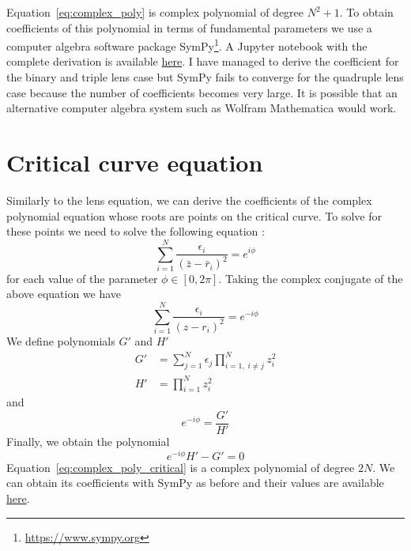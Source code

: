 \documentclass[12pt,dvipsnames]{report}
\newcommand{\ssf}[1]{\textsf{#1}}
\begin{document}
Equation~\ref{eq:complex_poly} is complex polynomial of degree $N^2+1$. To obtain coefficients of this
polynomial in terms of fundamental parameters we use a computer algebra software package \ssf{SymPy}\footnote{
    \url{https://www.sympy.org}
}\citep{10.7717/peerj-cs.103}. A Jupyter notebook with the complete derivation is available
\href{https://github.com/fbartolic/caustics/blob/main/notebooks/ComplexPolynomialCoefficients.ipynb}{here}.
I have managed to derive the coefficient for the binary and triple lens case but \ssf{SymPy} fails to
converge for the quadruple lens case because the number of coefficients becomes very large.
It is possible that an alternative computer algebra system such as Wolfram Mathematica would work.

\section{Critical curve equation}
\label{app:complex_poly_crit}
Similarly to the lens equation, we can derive the coefficients of the complex
polynomial equation whose roots are points on the critical curve. To solve for
these points we need to solve the following equation
\citep{1990A&A...236..311W}:
\begin{equation}
    \sum_{i=1}^{N} \frac{\epsilon_{i}}{\left(\bar{z}-\bar{r}_{i}\right)^{2}}=e^{i \phi}
\end{equation}
for each value of the parameter $\phi\in[0,2\pi]$.
Taking the complex conjugate of the above equation we have
\begin{equation}
    \sum_{i=1}^{N} \frac{\epsilon_{i}}{\left(z-r_{i}\right)^{2}}=e^{-i \phi}
\end{equation}
We define polynomials $G'$ and $H'$
\begin{align}
    G' & = \sum_{j=1}^N\epsilon_j\prod_{i=1,\;i\neq j}^Nz^2_i \\
    H' & = \prod_{i=1}^Nz^2_i
\end{align}
and
\begin{equation}
    e^{-i\phi}=\frac{G'}{H'}
\end{equation}
Finally, we obtain the polynomial
\begin{equation}
    e^{-i\phi}H' - G' = 0
    \label{eq:complex_poly_critical}
\end{equation}
Equation~\ref{eq:complex_poly_critical} is a complex polynomial of degree $2N$. We can
obtain its coefficients with \ssf{SymPy} as before and their values are available
\href{https://github.com/fbartolic/caustics/blob/main/notebooks/ComplexPolynomialCoefficients.ipynb}{here}.


\end{document}

